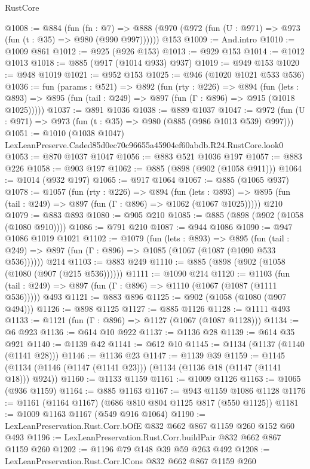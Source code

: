 \begin{lexlean}{RustCore}
\begin{coremodule}
@1008 := @884
    (fun (fn : @7) =>
    @888 (@970 (@972 (fun (U : @971) => @973 (fun (t : @35) => @980 (@990 @997))))))
    @153
@1009 := And.intro
@1010 := @1009 @861
@1012 := @925 (@926 @153)
@1013 := @929 @153
@1014 := @1012 @1013
@1018 := @885 (@917 (@1014 @933) @937)
@1019 := @949 @153
@1020 := @948 @1019
@1021 := @952 @153
@1025 := @946 (@1020 @1021 @533 @536)
@1036 := fun (params : @521) =>
  @892
    (fun (rty : @226) =>
    @894
      (fun (lets : @893) =>
      @895 (fun (tail : @249) => @897 (fun (Γ : @896) => @915 (@1018 @1025)))))
@1037 := @891 @1036
@1038 := @889 @1037
@1047 := @972 (fun (U : @971) => @973 (fun (t : @35) => @980 (@885 (@986 @1013 @539) @997)))
@1051 := @1010 (@1038 @1047) LexLeanPreserve.Caded85d0ec70c96655a45904ef60abdb.R24.RustCore.look0
@1053 := @870 @1037 @1047
@1056 := @883 @521 @1036 @197
@1057 := @883 @226
@1058 := @903 @197
@1062 := @885 (@898 (@902 (@1058 @911)))
@1064 := @1014 (@932 @197)
@1065 := @917 @1064
@1067 := @885 (@1065 @937)
@1078 := @1057
    (fun (rty : @226) =>
    @894
      (fun (lets : @893) =>
      @895 (fun (tail : @249) => @897 (fun (Γ : @896) => @1062 (@1067 @1025)))))
    @210
@1079 := @883 @893
@1080 := @905 @210
@1085 := @885 (@898 (@902 (@1058 (@1080 @910))))
@1086 := @791 @210
@1087 := @944 @1086
@1090 := @947 @1086 @1019 @1021
@1102 := @1079
    (fun (lets : @893) =>
    @895 (fun (tail : @249) => @897 (fun (Γ : @896) => @1085 (@1067 (@1087 (@1090 @533 @536))))))
    @214
@1103 := @883 @249
@1110 := @885 (@898 (@902 (@1058 (@1080 (@907 (@215 @536))))))
@1111 := @1090 @214
@1120 := @1103
    (fun (tail : @249) => @897 (fun (Γ : @896) => @1110 (@1067 (@1087 (@1111 @536)))))
    @493
@1121 := @883 @896
@1125 := @902 (@1058 (@1080 (@907 @494)))
@1126 := @898 @1125
@1127 := @885 @1126
@1128 := @1111 @493
@1133 := @1121 (fun (Γ : @896) => @1127 (@1067 (@1087 @1128)))
@1134 := @6 @923
@1136 := @614 @10 @922
@1137 := @1136 @28
@1139 := @614 @35 @921
@1140 := @1139 @42
@1141 := @612 @10
@1145 := @1134 (@1137 (@1140 (@1141 @28)))
@1146 := @1136 @23
@1147 := @1139 @39
@1159 := @1145 (@1134 (@1146 (@1147 (@1141 @23))) (@1134 (@1136 @18 (@1147 (@1141 @18))) @924))
@1160 := @1133 @1159
@1161 := @1009 @1126
@1163 := @1065 (@936 @1159)
@1164 := @885 @1163
@1167 := @943 @1159 @1086 @1128
@1176 := @1161 (@1164 @1167) (@686 @810 @804 @1125 @817 (@550 @1125))
@1181 := @1009 @1163 @1167 (@549 @916 @1064)
@1190 := LexLeanPreservation.Rust.Corr.bOfE @832 @662 @867 @1159 @260 @152 @60 @493
@1196 := LexLeanPreservation.Rust.Corr.buildPair @832 @662 @867 @1159 @260
@1202 := @1196 @79 @148 @39 @59 @263 @492
@1208 := LexLeanPreservation.Rust.Corr.lCons @832 @662 @867 @1159 @260

\end{coremodule}
\end{lexlean}
